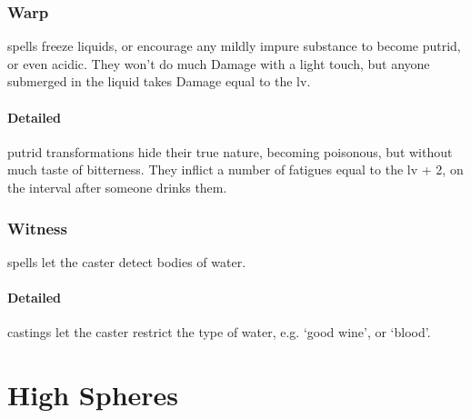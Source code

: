 \begin{multicols}{2}
\subsubsection{Warp}
spells freeze liquids, or encourage any mildly impure substance to become putrid, or even acidic.
They won't do much Damage with a light touch, but anyone submerged in the liquid takes Damage equal to the \gls{lv}.

\paragraph{Detailed}
putrid transformations hide their true nature, becoming poisonous, but without much taste of bitterness.
They inflict a number of \glspl{fatigue} equal to the \gls{lv} + 2, on the \gls{interval} after someone drinks them.

\subsubsection{Witness}
spells let the caster detect bodies of water.

\paragraph{Detailed}
castings let the caster restrict the type of water, e.g. `good wine', or `blood'.

\end{multicols}

\section{High Spheres}

